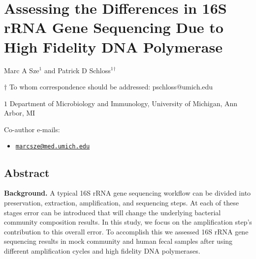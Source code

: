 \documentclass[11pt,]{article}
\title{}
\author{}
\date{}
\providecommand{\tightlist}{%
  \setlength{\itemsep}{0pt}\setlength{\parskip}{0pt}}
\begin{document}
\section{Assessing the Differences in 16S rRNA Gene Sequencing Due to
High Fidelity DNA
Polymerase}\label{assessing-the-differences-in-16s-rrna-gene-sequencing-due-to-high-fidelity-dna-polymerase}

\begin{center}
\vspace{25mm}

Marc A Sze${^1}$ and Patrick D Schloss${^1}$${^\dagger}$

\vspace{20mm}

$\dagger$ To whom correspondence should be addressed: pschloss@umich.edu

$1$ Department of Microbiology and Immunology, University of Michigan, Ann Arbor, MI




\end{center}

Co-author e-mails:

\begin{itemize}
\tightlist
\item
  \href{mailto:marcsze@med.umich.edu}{\nolinkurl{marcsze@med.umich.edu}}
\end{itemize}

\newpage

\linenumbers

\subsection{Abstract}\label{abstract}

\textbf{Background.} A typical 16S rRNA gene sequencing workflow can be
divided into preservation, extraction, amplification, and sequencing
steps. At each of these stages error can be introduced that will change
the underlying bacterial community composition results. In this study,
we focus on the amplification step's contribution to this overall error.
To accomplish this we assessed 16S rRNA gene sequencing results in mock
community and human fecal samples after using different amplification
cycles and high fidelity DNA polymerases.
\end{document}
